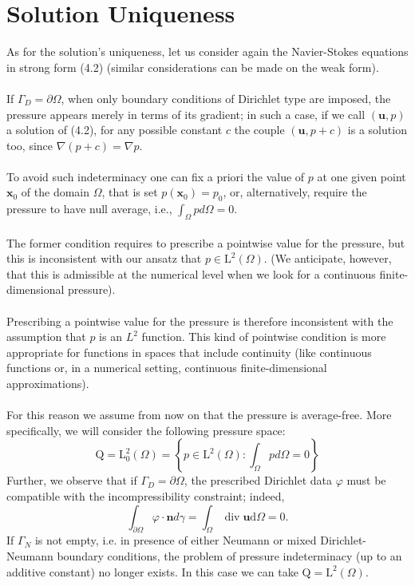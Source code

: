 \documentclass[11pt]{book}
\begin{document}
\section{Solution Uniqueness}
As for the solution's uniqueness, let us consider again the Navier-Stokes equations in strong form (4.2) (similar considerations can be made on the weak form).\\ \\
If $\Gamma_{D}=\partial \Omega$, when only boundary conditions of Dirichlet type are imposed, the pressure appears merely in terms of its gradient; in such a case, if we call $(\mathbf{u}, p)$ a solution of (4.2), for any possible constant $c$ the couple $(\mathbf{u}, p+c)$ is a solution too, since $\nabla(p+c)=\nabla p$.\\ \\
To avoid such indeterminacy one can fix a priori the value of $p$ at one given point $\mathbf{x}_{0}$ of the domain $\Omega$, that is set $p\left(\mathbf{x}_{0}\right)=p_{0}$, or, alternatively, require the pressure to have null average, i.e., $\int_{\Omega} p d \Omega=0$.\\ \\
The former condition requires to prescribe a pointwise value for the pressure, but this is inconsistent with our ansatz that $p \in \mathrm{L}^{2}(\Omega)$. (We anticipate, however, that this is admissible at the numerical level when we look for a continuous finite-dimensional pressure).\\ \\
Prescribing a pointwise value for the pressure is therefore inconsistent with the assumption that \( p \) is an \( L^2 \) function. This kind of pointwise condition is more appropriate for functions in spaces that include continuity (like continuous functions or, in a numerical setting, continuous finite-dimensional approximations).\\ \\
For this reason we assume from now on that the pressure is average-free. More specifically, we will consider the following pressure space:
$$
\mathrm{Q}=\mathrm{L}_{0}^{2}(\Omega)=\left\{p \in \mathrm{L}^{2}(\Omega): \int_{\Omega} p d \Omega=0\right\}
$$
Further, we observe that if $\Gamma_{D}=\partial \Omega$, the prescribed Dirichlet data $\varphi$ must be compatible with the incompressibility constraint; indeed,
$$
\int_{\partial \Omega} \varphi \cdot \mathbf{n} d \gamma=\int_{\Omega} \operatorname{div} \mathbf{u} \mathrm{d} \Omega=0 .
$$
If $\Gamma_{N}$ is not empty, i.e. in presence of either Neumann or mixed Dirichlet-Neumann boundary conditions, the problem of pressure indeterminacy (up to an additive constant) no longer exists. In this case we can take $\mathrm{Q}=\mathrm{L}^{2}(\Omega)$.\\ \\
\end{document}
